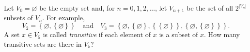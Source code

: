 Let $V_0=\varnothing$ be the empty set and, for $n=0,1,2,\dots$, let $V_{n+1}$ be the set of all $2^{|V_n|}$ subsets of $V_n$. For example,
\[V_2=\left\{\varnothing,\left\{\varnothing\right\}\right\}\quad\text{and}\quad V_3=\left\{\varnothing,\left\{\varnothing\right\},\left\{\left\{\varnothing\right\}\right\},\left\{\varnothing,\left\{\varnothing\right\}\right\}\right\}.\]
A set $x\in V_5$ is called \emph{transitive} if each element of $x$ is a subset of $x$. How many transitive sets are there in $V_5$?
